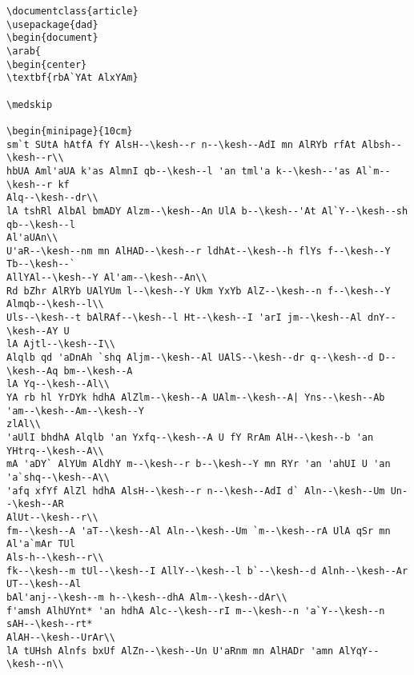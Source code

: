 \documentclass[11pt,a4paper]{article}
\begin{document}
\begin{figure*}[p]

\kern-2cm

\scriptsize
\begin{verbatim}
\documentclass{article}
\usepackage{dad}
\begin{document}
\arab{
\begin{center}
\textbf{rbA`YAt AlxYAm}

\medskip

\begin{minipage}{10cm}
sm`t SUtA hAtfA fY AlsH--\kesh--r n--\kesh--AdI mn AlRYb rfAt Albsh--\kesh--r\\
hbUA Aml'aUA k'as AlmnI qb--\kesh--l 'an tml'a k--\kesh--'as Al`m--\kesh--r kf
Alq--\kesh--dr\\
lA tshRl AlbAl bmADY Alzm--\kesh--An UlA b--\kesh--'At Al`Y--\kesh--sh qb--\kesh--l
Al'aUAn\\
U'aR--\kesh--nm mn AlHAD--\kesh--r ldhAt--\kesh--h flYs f--\kesh--Y Tb--\kesh--`
AllYAl--\kesh--Y Al'am--\kesh--An\\
Rd bZhr AlRYb UAlYUm l--\kesh--Y Ukm YxYb AlZ--\kesh--n f--\kesh--Y Almqb--\kesh--l\\
Uls--\kesh--t bAlRAf--\kesh--l Ht--\kesh--I 'arI jm--\kesh--Al dnY--\kesh--AY U
lA Ajtl--\kesh--I\\
Alqlb qd 'aDnAh `shq Aljm--\kesh--Al UAlS--\kesh--dr q--\kesh--d D--\kesh--Aq bm--\kesh--A
lA Yq--\kesh--Al\\
YA rb hl YrDYk hdhA AlZlm--\kesh--A UAlm--\kesh--A| Yns--\kesh--Ab 'am--\kesh--Am--\kesh--Y
zlAl\\
'aUlI bhdhA Alqlb 'an Yxfq--\kesh--A U fY RrAm AlH--\kesh--b 'an YHtrq--\kesh--A\\
mA 'aDY` AlYUm AldhY m--\kesh--r b--\kesh--Y mn RYr 'an 'ahUI U 'an 'a`shq--\kesh--A\\
'afq xfYf AlZl hdhA AlsH--\kesh--r n--\kesh--AdI d` Aln--\kesh--Um Un--\kesh--AR
AlUt--\kesh--r\\
fm--\kesh--A 'aT--\kesh--Al Aln--\kesh--Um `m--\kesh--rA UlA qSr mn Al'a`mAr TUl
Als-h--\kesh--r\\
fk--\kesh--m tUl--\kesh--I AllY--\kesh--l b`--\kesh--d Alnh--\kesh--Ar UT--\kesh--Al
bAl'anj--\kesh--m h--\kesh--dhA Alm--\kesh--dAr\\
f'amsh AlhUYnt* 'an hdhA Alc--\kesh--rI m--\kesh--n 'a`Y--\kesh--n sAH--\kesh--rt*
AlAH--\kesh--UrAr\\
lA tUHsh Alnfs bxUf AlZn--\kesh--Un U'aRnm mn AlHADr 'amn AlYqY--\kesh--n\\

\end{verbatim}
\end{figure*}
\end{document}
